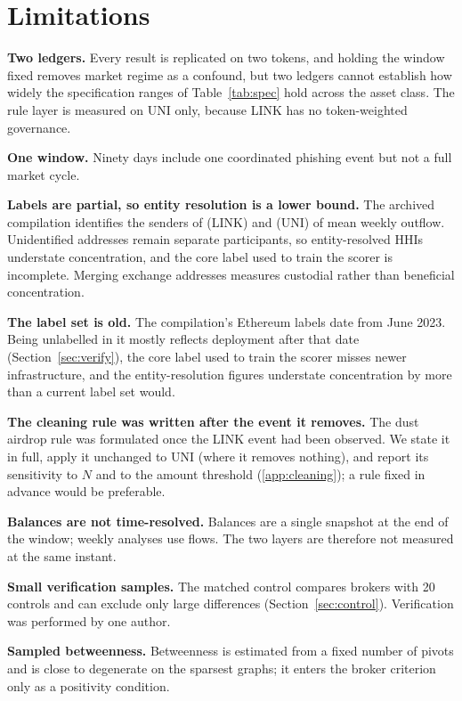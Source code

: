 \section{Limitations}
\label{sec:limitations}

\textbf{Two ledgers.} Every result is replicated on two tokens, and holding
the window fixed removes market regime as a confound, but two ledgers cannot
establish how widely the specification ranges of Table~\ref{tab:spec} hold
across the asset class. The rule layer is measured on UNI only, because LINK
has no token-weighted governance.

\textbf{One window.} Ninety days include one coordinated phishing event but
not a full market cycle.

\textbf{Labels are partial, so entity resolution is a lower bound.} The
archived compilation identifies the senders of  (LINK) and
 (UNI) of mean weekly outflow. Unidentified addresses remain
separate participants, so entity-resolved HHIs understate concentration, and
the core label used to train the scorer is incomplete. Merging exchange
addresses measures custodial rather than beneficial concentration.

\textbf{The label set is old.} The compilation's Ethereum labels date from
June 2023. Being unlabelled in it mostly reflects deployment after that date
(Section~\ref{sec:verify}), the core label used to train the scorer misses
newer infrastructure, and the entity-resolution figures understate
concentration by more than a current label set would.

\textbf{The cleaning rule was written after the event it removes.} The dust
airdrop rule was formulated once the LINK event had been observed. We state
it in full, apply it unchanged to UNI (where it removes nothing), and report
its sensitivity to $N$ and to the amount threshold (\ref{app:cleaning}); a
rule fixed in advance would be preferable.

\textbf{Balances are not time-resolved.} Balances are a single snapshot at
the end of the window; weekly analyses use flows. The two layers are
therefore not measured at the same instant.

\textbf{Small verification samples.} The matched control compares  brokers
with 20 controls and can exclude only large differences
(Section~\ref{sec:control}). Verification was performed by one author.

\textbf{Sampled betweenness.} Betweenness is estimated from a fixed number of
pivots and is close to degenerate on the sparsest graphs; it enters the
broker criterion only as a positivity condition.
